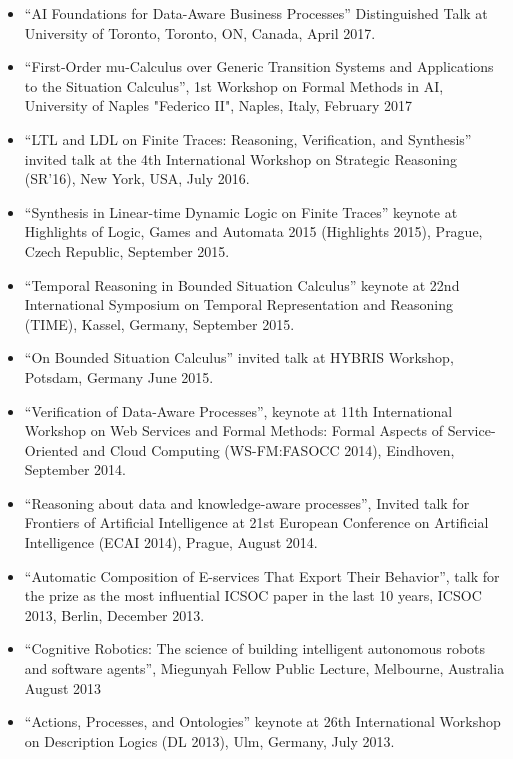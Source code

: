 \begin{itemize}
\item	``AI Foundations for Data-Aware Business Processes'' Distinguished Talk at University of Toronto, Toronto, ON, Canada, April 2017. 
\item	``First-Order mu-Calculus over Generic Transition Systems and Applications to the Situation Calculus'', 1st Workshop on Formal Methods in AI, University of Naples "Federico II", Naples, Italy, February 2017 
\item	``LTL and LDL on Finite Traces: Reasoning, Verification, and Synthesis'' invited talk at the 4th International Workshop on Strategic Reasoning (SR’16), New York, USA, July 2016.
\item	``Synthesis in Linear-time Dynamic Logic on Finite Traces'' keynote at Highlights of Logic, Games and Automata 2015 (Highlights 2015), Prague, Czech Republic, September 2015.
\item	``Temporal Reasoning in Bounded Situation Calculus'' keynote at 22nd International Symposium on Temporal Representation and Reasoning (TIME), Kassel, Germany, September 2015.
\item	``On Bounded Situation Calculus'' invited talk at HYBRIS Workshop, Potsdam, Germany June 2015.
\item	``Verification of Data-Aware Processes'', keynote at 11th International Workshop on Web Services and Formal Methods: Formal Aspects of Service-Oriented and Cloud Computing (WS-FM:FASOCC 2014), Eindhoven, September 2014.
\item	 ``Reasoning about data and knowledge-aware processes'', Invited talk for Frontiers of Artificial Intelligence at 21st European Conference on Artificial Intelligence (ECAI 2014), Prague, August 2014.
\item	 ``Automatic Composition of E-services That Export Their Behavior'', talk for the prize as the most influential ICSOC paper in the last 10 years, ICSOC 2013, Berlin, December 2013.
\item	 ``Cognitive Robotics: The science of building intelligent autonomous robots and software agents'', Miegunyah Fellow Public Lecture, Melbourne, Australia August 2013 
\item	``Actions, Processes, and Ontologies'' keynote at 26th International Workshop on Description Logics (DL 2013), Ulm, Germany, July 2013.

\end{itemize}
